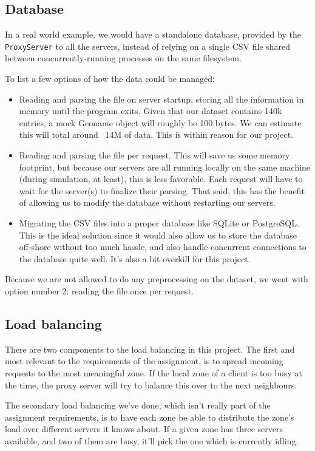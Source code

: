 \documentclass{article}
\def\code#1{\colorbox{gray!20}{\texttt{#1}}}
\begin{document}
\subsection{Database}
In a real world example, we would have a standalone database, provided by the \code{ProxyServer} to all the servers, instead of relying on a single CSV file shared between concurrently-running processes on the same filesystem. 

To list a few options of how the data could be managed:
\begin{itemize}
    \item Reading and parsing the file on server startup, storing all the information in memory until the program exits. Given that our dataset contains 140k entries, a mock Geoname object will roughly be 100 bytes. We can estimate this will total around ~14M of data. This is within reason for our project.
    \item Reading and parsing the file per request. This will save us some memory footprint, but because our servers are all running locally on the same machine (during simulation, at least), this is less favorable. Each request will have to wait for the server(s) to finalize their parsing. That said, this has the benefit of allowing us to modify the database without restarting our servers.
    \item Migrating the CSV files into a proper database like SQLite or PostgreSQL. This is the ideal solution since it would also allow us to store the database off-shore without too much hassle, and also handle concurrent connections to the database quite well. It's also a bit overkill for this project.
\end{itemize}

Because we are not allowed to do any preprocessing on the dataset, we went with option number 2: reading the file once per request.

\subsection{Load balancing}
There are two components to the load balancing in this project. The first and most relevant to the requirements of the assignment, is to spread incoming requests to the most meaningful zone. If the local zone of a client is too busy at the time, the proxy server will try to balance this over to the next neighbours.

The secondary load balancing we've done, which isn't really part of the assignment requirements, is to have each zone be able to distribute the zone's load over different servers it knows about. If a given zone has three servers available, and two of them are busy, it'll pick the one which is currently idling.
\end{document}
